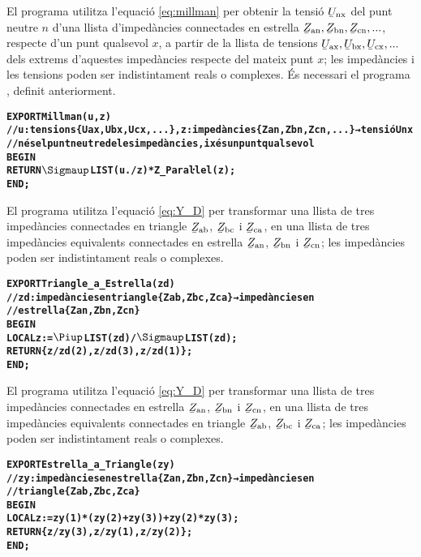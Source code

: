 El programa  utilitza l'equació \eqref{eq:millman} per obtenir la tensió $\cmplx{U}\ped{nx}$ del punt neutre $n$ d'una llista d'impedàncies connectades en estrella $\cmplx{Z}\ped{an}, \cmplx{Z}\ped{bn}, \cmplx{Z}\ped{cn}, ...$, respecte d'un punt qualsevol $x$, a partir de la llista de tensions $\cmplx{U}\ped{ax}, \cmplx{U}\ped{bx}, \cmplx{U}\ped{cx}, ...$ dels extrems d'aquestes impedàncies respecte del mateix punt $x$; les impedàncies i les tensions poden ser indistintament reals o complexes. És necessari el programa , definit anteriorment.
\vspace{-1cm}
\begin{alltt}
\bfseries
{}
    EXPORT Millman(u,z)
    // u:tensions \{Uax,Ubx,Ucx,...\}, z:impedàncies \{Zan,Zbn,Zcn,...\} → tensió Unx
    // n és el punt neutre de les impedàncies, i x és un punt qualsevol
    BEGIN
      RETURN \(\Sigmaup\)LIST(u ./ z) * Z_Paraŀlel(z);
    END;
\end{alltt}


El programa  utilitza l'equació \eqref{eq:Y_D} per transformar una llista de tres impedàncies connectades en triangle $\cmplx{Z}\ped{ab}$, $\cmplx{Z}\ped{bc}$ i  $\cmplx{Z}\ped{ca}$, en una llista de tres impedàncies equivalents connectades en estrella $\cmplx{Z}\ped{an}$, $\cmplx{Z}\ped{bn}$ i $\cmplx{Z}\ped{cn}$; les impedàncies poden ser indistintament reals o complexes.
\vspace{-1cm}
\begin{alltt}
\bfseries
{}
    EXPORT Triangle_a_Estrella(zd)
    // zd:impedàncies en triangle \{Zab,Zbc,Zca\} → impedàncies en
    // estrella \{Zan,Zbn,Zcn\}
    BEGIN
      LOCAL z:=\(\Piup\)LIST(zd)/\(\Sigmaup\)LIST(zd);
      RETURN \{z/zd(2),z/zd(3),z/zd(1)\};
    END;
\end{alltt}

El programa  utilitza l'equació \eqref{eq:Y_D} per transformar una llista de tres impedàncies connectades en estrella $\cmplx{Z}\ped{an}$, $\cmplx{Z}\ped{bn}$ i $\cmplx{Z}\ped{cn}$, en una llista de tres impedàncies equivalents connectades en triangle $\cmplx{Z}\ped{ab}$, $\cmplx{Z}\ped{bc}$ i  $\cmplx{Z}\ped{ca}$; les impedàncies poden ser indistintament reals o complexes.
\vspace{-1cm}
\begin{alltt}
\bfseries
{}
    EXPORT Estrella_a_Triangle(zy)
    // zy:impedàncies en estrella \{Zan,Zbn,Zcn\} → impedàncies en
    // triangle \{Zab,Zbc,Zca\}
    BEGIN
      LOCAL z:=zy(1)*(zy(2)+zy(3))+zy(2)*zy(3);
      RETURN \{z/zy(3),z/zy(1),z/zy(2)\};
    END;
\end{alltt}

